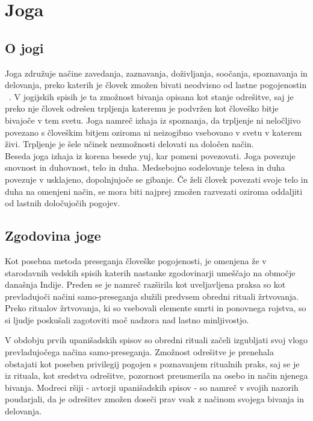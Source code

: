 \documentclass[a4paper, 12pt]{book}
\begin{document}
\chapter{Joga}
\label{ch0}

\section{O jogi}
Joga združuje načine zavedanja, zaznavanja, doživljanja, soočanja, spoznavanja in delovanja, preko katerih je človek zmožen bivati neodvisno od lastne pogojenostin ~\cite{oJogi}. V jogijskih spisih je ta zmožnost bivanja opisana kot stanje odrešitve, saj je preko nje človek odrešen trpljenja kateremu je podvržen kot človeško bitje bivajoče v tem svetu. Joga namreč izhaja iz spoznanja, da trpljenje ni neločljivo povezano s človeškim bitjem oziroma ni neizogibno vsebovano v svetu v katerem živi. Trpljenje je šele učinek nezmožnosti delovati na določen način. \\ 

Beseda joga izhaja iz korena besede yuj, kar pomeni povezovati. Joga povezuje snovnost in duhovnost, telo in duha. Medsebojno sodelovanje telesa in duha povezuje v usklajeno, dopolnjujoče se gibanje. Če želi človek povezati svoje telo in duha na omenjeni način, se mora biti najprej zmožen razvezati oziroma oddaljiti od lastnih določujočih pogojev.\\ 

\section{Zgodovina joge}
Kot posebna metoda preseganja človeške pogojenosti, je omenjena že v starodavnih vedskih spisih katerih nastanke zgodovinarji umeščajo na območje današnja Indije. Preden se je namreč razširila kot uveljavljena praksa so kot prevladujoči načini samo-preseganja služili predvsem obredni rituali žrtvovanja. Preko ritualov žrtvovanja, ki so vsebovali elemente smrti in ponovnega rojstva, so si ljudje poskušali zagotoviti moč nadzora nad lastno minljivostjo. 

V obdobju prvih upanišadskih spisov so obredni rituali začeli izgubljati svoj vlogo prevladujočega načina samo-preseganja. Zmožnost odrešitve je prenehala obstajati kot poseben privilegij pogojen s poznavanjem ritualnih praks, saj se je iz rituala, kot sredstva odrešitve, pozornost preusmerila na osebo in način njenega bivanja. Modreci ršiji - avtorji upanišadskih spisov - so namreč v svojih nazorih poudarjali, da je odrešitev zmožen doseči prav vsak z načinom svojega bivanja in delovanja.
\end{document}
